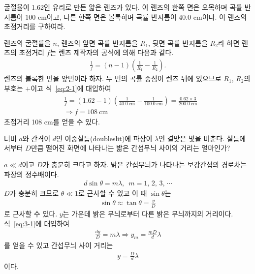 \documentclass[tightenlines,floatfix,nofootinbib,superscriptaddress,fleqn]{revtex4}
\begin{document}
굴절율이 1.62인 유리로 만든 얇은 렌즈가 있다. 이 렌즈의 한쪽 면은
오목하며 곡률 반지름이 100 cm이고, 다른 한쪽 면은 볼록하며
곡률 반지름이 40.0 cm이다. 이 렌즈의 초점거리를 구하여라. 

렌즈의 굴절률을 $n$, 렌즈의 앞면 곡률 반지름을 $R_1$, 뒷면 곡률 반지름을 $R_2$라
하면 렌즈의 초점거리 $f$는 렌즈 제작자의 공식에 의해 다음과 같다.
\begin{align}\label{eq:2-1}
  \frac{1}{f} = (n-1)\left(\frac{1}{R_1}-\frac{1}{R_2}\right).
\end{align}
렌즈의 볼록한 면을 앞면이라 하자. 두 면의 곡률 중심이 렌즈 뒤에 있으므로 
$R_1$, $R_2$의 부호는 $+$이고 식~\eqref{eq:2-1}에 대입하여
\begin{align}
  \begin{split}
    &\frac{1}{f}=(1.62-1)\left(\frac{1}{40.0~\mathrm{cm}}
    -\frac{1}{100.0~\mathrm{cm}}\right)
    =\frac{0.62\times3}{200.0~\mathrm{cm}}\\ &\Longrightarrow
    f=108~\mathrm{cm}
  \end{split}
\end{align}
초점거리 108 cm를 얻을 수 있다.


\vspace{1cm}

너비 $a$와 간격이 $d$인 이중실틈(doubleslit)에 파장이 $\lambda$인
결맞은 빛을 비춘다. 실틈에서부터 $D$만큼 떨어진 화면에 나타나는 밟은
간섭무늬 사이의 거리는 얼마인가?


$a\ll d$이고 $D$가 충분히 크다고 하자.
밝은 간섭무늬가 나타나는 보강간섭의 경로차는 파장의 정수배이다.
\begin{align}\label{eq:3-1}
  d\sin\theta = m\lambda,\,\,\, m =1,\,2,\,3,\,\cdots
\end{align}
$D$가 충분히 크므로 $\theta\ll 1$로 근사할 수 있고 이 때 $\sin\theta$는
\begin{align}
  \sin\theta \approx \tan\theta = \frac{y}{D}
\end{align}
로 근사할 수 있다. $y$는 가운데 밝은 무늬로부터 다른 밝은 무늬까지의 거리이다.
식~\eqref{eq:3-1}에 대입하여
\begin{align}
  \frac{dy}{D}=m\lambda\Longrightarrow
  y_m = \frac{mD}{d}\lambda
\end{align}
를 얻을 수 있고 간섭무늬 사이 거리는
\begin{align}
  y = \frac{D}{d}\lambda
\end{align}
이다.
\end{document}
